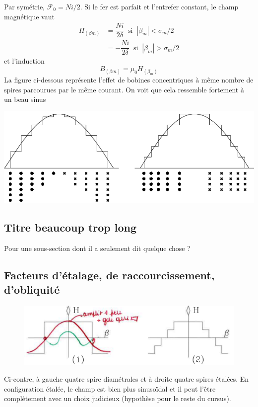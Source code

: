 	Par symétrie, $\mathcal{F}_0 = Ni/2$. Si le fer est parfait et l'entrefer constant, 
	le champ magnétique vaut 
	\begin{equation}
	\begin{array}{ll}
	H_{(\beta m)} &= \dfrac{Ni}{2\delta}\ \text{ si }\ |\beta_m|<\sigma_m/2\\
	&= -\dfrac{Ni}{2\delta}\ \text{ si }\ |\beta_m|>\sigma_m/2
	\end{array}
	\end{equation}
	et l'induction
	\begin{equation}
	B_{(\beta m)} = \mu_0H_{(\beta_m)}
	\end{equation}
	La figure ci-dessous représente l'effet de bobines concentriques à même nombre de 
	spires parcourues par le même courant. On voit que cela ressemble fortement à un 
	beau sinus
	\begin{center}
	\includegraphics[scale=0.38]{ch5/image10.png}
	\end{center}
	
	\subsection{Titre beaucoup trop long}
	Pour une sous-section dont il a seulement dit quelque chose ?
	
	\newpage
	\subsection{Facteurs d'étalage, de raccourcissement, d'obliquité}
	\begin{figure}
	\vspace{-5mm}
	\includegraphics[scale=0.38]{ch5/image11.png}
	\end{figure}
	Ci-contre, à gauche quatre spire diamétrales et à droite quatre spires 
	étalées. En configuration étalée, le champ est bien plus sinusoïdal et il peut 
	l'être complètement avec un choix judicieux (hypothèse pour le reste du cursus).\\

